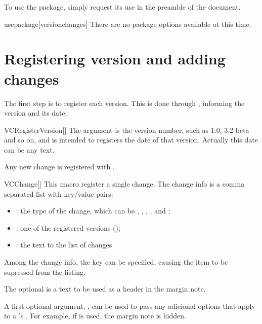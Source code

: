 \documentclass[a4paper, 11pt]{article}
\begin{document}
To use the package, simply request its use in the preamble of the document.

\begin{macro*}{usepackage}{}[versionchanges]
    There are no package options available at this time.
\end{macro*}


\section{Registering version and adding changes}

The first step is to register each version. This is done through , informing the version and its date.

\begin{macro}{VCRegisterVersion}[]
    The argument  is the version number, such as 1.0, 3.2-beta and so on, and  is intended to registers the date of that version. Actually this date can be any text.
\end{macro}

\begin{latexcode}
\end{latexcode}

Any new change is registered with .

\begin{macro}{VCChange}[]
    This macro register a single change. The change info is a comma separated list with key/value pairs:
    \begin{itemize}
        \item {}: the type of the change, which can be , , , , and ;
        \item {}: one of the registered versions ();
        \item {}: the text to the list of changes
    \end{itemize}

    \medskip
    Among the change info, the key  can be specified, causing the item to be supressed from the listing.

    The optional  is a text to be used as a header in the margin note.

    A first optional argument, , can be used to pass any adicional options that apply to a 's . For example, if  is used, the margin note is hidden.
\end{macro}
\end{document}
